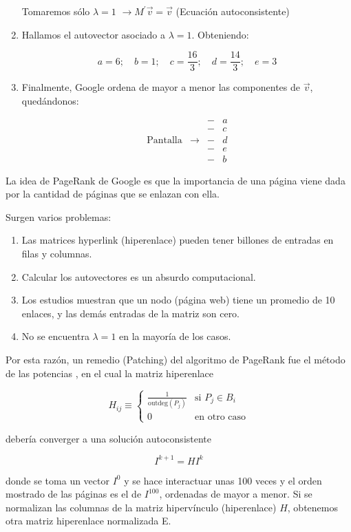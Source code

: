 \begin{enumerate}
Tomaremos sólo $\lambda = 1$ $\rightarrow M^\prime \vec{v} = \vec{v}$ (Ecuación autoconsistente)

\item Hallamos el autovector asociado a $\lambda = 1$. Obteniendo:

\[
a = 6; \quad b = 1; \quad c = \frac{16}{3}; \quad d = \frac{14}{3}; \quad e = 3
\]

\item Finalmente, Google ordena de mayor a menor las componentes de $\vec{v}$, quedándonos:

\[
\begin{matrix}
& & - & a \\
& & - & c \\
\text{Pantalla} & \rightarrow & - & d \\
& & - & e \\
& & - & b
\end{matrix}
\]
\end{enumerate}

La idea de PageRank de Google es que la importancia de una página viene dada por la cantidad de páginas que se enlazan con ella.

Surgen varios problemas:

\begin{enumerate}
  \item Las matrices hyperlink (hiperenlace) pueden tener billones de entradas en filas y columnas.
  \item Calcular los autovectores es un absurdo computacional.
  \item Los estudios muestran que un nodo (página web) tiene un promedio de 10 enlaces, y las demás entradas de la matriz son cero.
  \item No se encuentra $\lambda = 1$ en la mayoría de los casos.
\end{enumerate}

Por esta razón, un remedio (Patching) del algoritmo de PageRank fue el método de las potencias \cite{Paparo_2012}, en el cual la matriz hiperenlace

\[
H_{ij} \equiv \begin{cases}
\frac{1}{\mathrm{outdeg}(P_j)} & \text{si } P_j \in B_i \\
0 & \text{en otro caso}
\end{cases}
\]

debería converger a una solución autoconsistente

\[
I^{k+1} = H I^k
\]

donde se toma un vector $I^{0}$ y se hace interactuar unas 100 veces y el orden mostrado de las páginas es el de $I^{100}$, ordenadas de mayor a menor. Si se normalizan las columnas de la matriz hipervínculo (hiperenlace) $H$, obtenemos otra matriz hiperenlace normalizada E.

